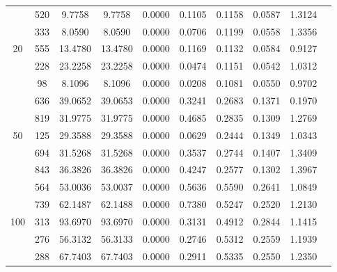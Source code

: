 \documentclass[journal]{IEEEtran}
\begin{document}
\begin{table}[h]
\begin{tabular}{|c|c|c|c|c|c|c|c|c|c|}
\multirow{5}{*}{20}
& 520 & 9.7758 & 9.7758 & 0.0000 & 0.1105 & 0.1158 & 0.0587 & 1.3124 \\
& 333 & 8.0590 & 8.0590 & 0.0000 & 0.0706 & 0.1199 & 0.0558 & 1.3356 \\
& 555 & 13.4780 & 13.4780 & 0.0000 & 0.1169 & 0.1132 & 0.0584 & 0.9127 \\
& 228 & 23.2258 & 23.2258 & 0.0000 & 0.0474 & 0.1151 & 0.0542 & 1.0312 \\
& 98 & 8.1096 & 8.1096 & 0.0000 & 0.0208 & 0.1081 & 0.0550 & 0.9702 \\
\hline
 
\multirow{5}{*}{50}
& 636 & 39.0652 & 39.0653 & 0.0000 & 0.3241 & 0.2683 & 0.1371 & 0.1970 \\
& 819 & 31.9775 & 31.9775 & 0.0000 & 0.4685 & 0.2835 & 0.1309 & 1.2769 \\
& 125 & 29.3588 & 29.3588 & 0.0000 & 0.0629 & 0.2444 & 0.1349 & 1.0343 \\
& 694 & 31.5268 & 31.5268 & 0.0000 & 0.3537 & 0.2744 & 0.1407 & 1.3409 \\
& 843 & 36.3826 & 36.3826 & 0.0000 & 0.4247 & 0.2577 & 0.1302 & 1.3967 \\
\hline

\multirow{5}{*}{100}
& 564 & 53.0036 & 53.0037 & 0.0000 & 0.5636 & 0.5590 & 0.2641 & 1.0849 \\
& 739 & 62.1487 & 62.1488 & 0.0000 & 0.7380 & 0.5247 & 0.2520 & 1.2130 \\
& 313 & 93.6970 & 93.6970 & 0.0000 & 0.3131 & 0.4912 & 0.2844 & 1.1415 \\
& 276 & 56.3132 & 56.3133 & 0.0000 & 0.2746 & 0.5312 & 0.2559 & 1.1939 \\
& 288 & 67.7403 & 67.7403 & 0.0000 & 0.2911 & 0.5335 & 0.2550 & 1.2350 \\
\hline

\end{tabular}

\label{tab:evaluation}
\end{table}
\end{document}
